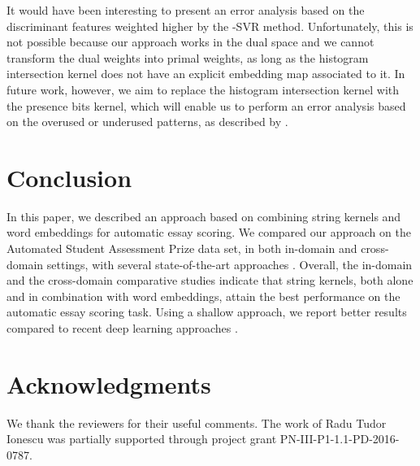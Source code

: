 \documentclass[11pt,a4paper]{article}
\begin{document}
It would have been interesting to present an error analysis based on the discriminant features weighted higher by the -SVR method. Unfortunately, this is not possible because our approach works in the dual space and we cannot transform the dual weights into primal weights, as long as the histogram intersection kernel does not have an explicit embedding map associated to it. In future work, however, we aim to replace the histogram intersection kernel with the presence bits kernel, which will enable us to perform an error analysis based on the overused or underused patterns, as described by .

\vspace*{-0.2cm} 
\section{Conclusion}
\label{sec_Conclusion}
\vspace*{-0.1cm} 

In this paper, we described an approach based on combining string kernels and word embeddings for automatic essay scoring. We compared our approach on the Automated Student Assessment Prize data set, in both in-domain and cross-domain settings, with several state-of-the-art approaches \cite{Phandi-EMNLP-2015,Dong-EMNLP-2016,Dong-CONLL-2017,Tay-ACL-2018}. Overall, the in-domain and the cross-domain comparative studies indicate that string kernels, both alone and in combination with word embeddings, attain the best performance on the automatic essay scoring task. Using a shallow approach, we report better results compared to recent deep learning approaches \cite{Dong-EMNLP-2016,Dong-CONLL-2017,Tay-ACL-2018}.

\section*{Acknowledgments}
We thank the reviewers for their useful comments. The work of Radu Tudor Ionescu was partially supported through project grant PN-III-P1-1.1-PD-2016-0787.



\end{document}
